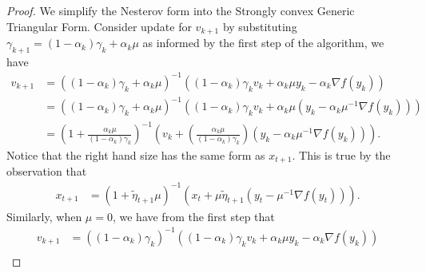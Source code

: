 \documentclass[12pt]{article}
\begin{document}
            \begin{proof}
                We simplify the Nesterov form into the Strongly convex Generic Triangular Form. 
                Consider update for $v_{k + 1}$ by substituting $\gamma_{k+1} = (1 - \alpha_k) \gamma_k + \alpha_k \mu$ as informed by the first step of the algorithm, we have 
                \begin{align*}
                    v_{k + 1} &= 
                    ((1 - \alpha_k)\gamma_k + \alpha_k \mu)^{-1}
                    \left(
                        (1 - \alpha_k)\gamma_k v_k + \alpha_k \mu y_k - \alpha_k \nabla f(y_k)
                    \right)
                    \\
                    &= ((1 - \alpha_k)\gamma_k + \alpha_k \mu)^{-1}
                    (
                        (1 - \alpha_k)\gamma_k v_k + \alpha_k \mu(y_k - \alpha_k \mu^{-1}\nabla f(y_k))
                    )
                    \\
                    &= 
                    \left(
                        1 + \frac{\alpha_k \mu}{(1 - \alpha_k)\gamma_k}
                    \right)^{-1}
                    \left(
                        v_k
                        + 
                        \left(
                            \frac{\alpha_k \mu}{(1 - \alpha_k)\gamma_k} 
                        \right)
                        \left(
                            y_k 
                            - \alpha_k \mu^{-1}\nabla f(y_k)
                        \right)
                    \right). 
                \end{align*}
                Notice that the right hand size has the same form as $x_{t + 1}$. 
                This is true by the observation that 
                \begin{align*}
                    x_{t + 1} &= 
                    (1 + \tilde\eta_{t + 1}\mu)^{-1}
                    \left( 
                        x_t + \mu\tilde \eta_{t + 1}
                        \left(y_t - \mu^{-1}\nabla f(y_t)\right)
                    \right). 
                \end{align*}
                Similarly, when $\mu = 0$, we have from the first step that 
                \begin{align*}
                    v_{k + 1} 
                    &= ((1 - \alpha_k)\gamma_k)^{-1}
                    (
                        (1 - \alpha_k)\gamma_k v_k
                        + \alpha_k \mu y_k - \alpha_k \nabla f(y_k)
                    )
                    \\

\end{align*}
\end{proof}
\end{document}
